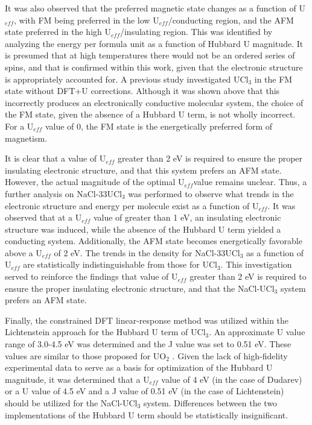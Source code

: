 \documentclass[preprint,3p,10pt,onecolumn,number,sort&compress]{elsarticle}
\begin{document}
It was also observed that the preferred magnetic state changes as a function of U$_{eff}$, with FM being preferred in the low U$_{eff}$/conducting region, and the AFM state preferred in the high U$_{eff}$/insulating region. This was identified by analyzing the energy per formula unit as a function of Hubbard U magnitude. It is presumed that at high temperatures there would not be an ordered series of spins, and that is confirmed within this work, given that the electronic structure is appropriately accounted for. A previous study \cite{Li} investigated UCl$_3$ in the FM state without DFT+U corrections. Although it was shown above that this incorrectly produces an electronically conductive molecular system, the choice of the FM state, given the absence of a Hubbard U term, is not wholly incorrect. For a U$_{eff}$ value of 0, the FM state is the energetically preferred form of magnetism.  

It is clear that a value of U$_{eff}$ greater than 2 eV is required to ensure the proper insulating electronic structure, and that this system prefers an AFM state. However, the actual magnitude of the optimal U$_{eff}$value remains unclear. Thus, a further analysis on NaCl-33UCl$_3$ was performed to observe what trends in the electronic structure and energy per molecule exist as a function of U$_{eff}$. It was observed that at a U$_{eff}$ value of greater than 1 eV, an insulating electronic structure was induced, while the absence of the Hubbard U term yielded a conducting system. Additionally, the AFM state becomes energetically favorable above a U$_{eff}$ of 2 eV. The trends in the density for NaCl-33UCl$_3$ as a function of U$_{eff}$ are statistically indistinguishable from those for UCl$_3$. This investigation served to reinforce the findings that value of U$_{eff}$ greater than 2 eV is required to ensure the proper insulating electronic structure, and that the NaCl-UCl$_3$ system prefers an AFM state. 

Finally, the constrained DFT linear-response method \cite{PhysRevB.71.035105} was utilized within the Lichtenstein approach \cite{PhysRevB.52.R5467} for the Hubbard U term of UCl$_3$. An approximate U value range of 3.0-4.5 eV was determined and the J value was set to 0.51 eV. These values are similar to those proposed for UO$_2$ \cite{dudarev}. Given the lack of high-fidelity experimental data to serve as a basis for optimization of the Hubbard U magnitude, it was determined that a U$_{eff}$ value of 4 eV (in the case of Dudarev) or a U value of 4.5 eV and a J value of 0.51 eV (in the case of Lichtenstein) should be utilized for the NaCl-UCl$_3$ system. Differences between the two implementations of the Hubbard U term should be statistically insignificant.
\end{document}
